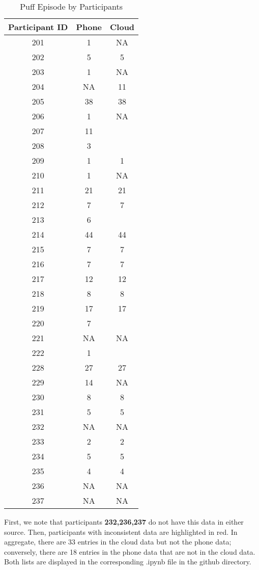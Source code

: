 \documentclass[11pt]{article}
\begin{document}
\begin{table}[htb]
\centering
\begin{tabular}{|c|c|c|} 
 \hline
Participant ID & Phone & Cloud \\
 \hline
 201 & 1 & NA \\
 \hline
 202 &  5 & 5 \\
 \hline
 203 & 1 & NA \\
 \hline
 204 & NA & 11 \\
\hline  
205 & 38 & 38 \\
\hline
206& 1 & NA \\
\hline
207 & 11 & \textcolor{12} \\
\hline
208 & 3 & \textcolor{7} \\
\hline
209 & 1 &  1 \\
\hline
210 & 1 & NA \\
\hline
211 & 21 & 21 \\
\hline
212 & 7 & 7 \\
\hline
213 & 6 & \textcolor{7} \\
\hline
214 & 44 & 44 \\
\hline
215 & 7 & 7 \\
\hline
216 & 7 & 7 \\
\hline
217 & 12 & 12 \\
\hline
218 & 8 & 8 \\
\hline
219 & 17 & 17 \\
\hline
220 & 7 & \textcolor{9} \\
\hline
221 & NA & NA \\
\hline
222 & 1 & \textcolor{15} \\
\hline
228 & 27 & 27 \\
\hline
229 & 14 & NA \\
\hline
230 & 8 & 8 \\
\hline
231 & 5 & 5 \\
\hline
232 & NA & NA \\
\hline
233 & 2 & 2 \\
\hline
234 & 5 & 5 \\
\hline
235 & 4 & 4 \\
\hline
236 & NA & NA \\
\hline
237 & NA & NA \\
\hline
\end{tabular}
\caption{Puff Episode by Participants}
\label{table:1}
\end{table}
First, we note that participants \textbf{232,236,237} do not have this data in either source. Then, participants with inconsistent data are highlighted in red.  In aggregate, there are 33 entries in the cloud data but not the phone data; conversely, there are 18 entries in the phone data that are not in the cloud data. Both lists are displayed in the corresponding .ipynb file in the github directory. 
\end{document}
